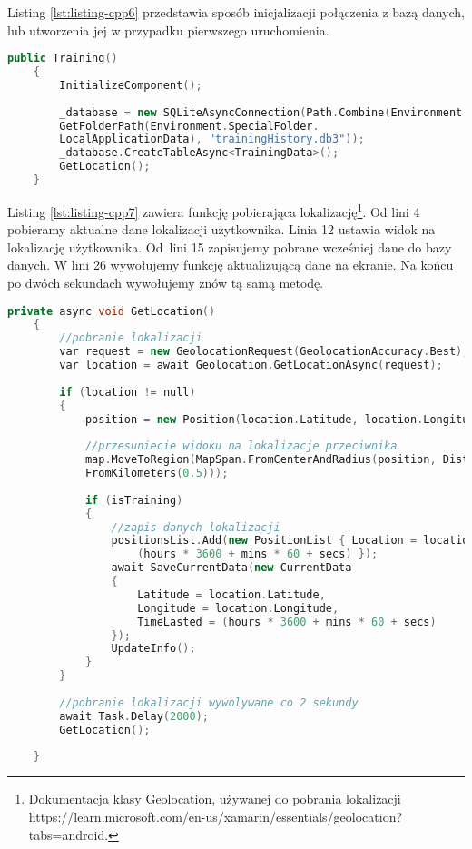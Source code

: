 \hspace{0.60cm}Listing \ref{lst:listing-cpp6} przedstawia sposób inicjalizacji połączenia z bazą danych, lub utworzenia jej w przypadku pierwszego uruchomienia.
\begin{lstlisting}[caption=Połączenie z bazą danych, label={lst:listing-cpp6}, language=C++]
	public Training()
	{
		InitializeComponent();
		
		_database = new SQLiteAsyncConnection(Path.Combine(Environment.
		GetFolderPath(Environment.SpecialFolder.
		LocalApplicationData), "trainingHistory.db3"));
		_database.CreateTableAsync<TrainingData>();
		GetLocation();
	}
\end{lstlisting}

Listing \ref{lst:listing-cpp7} zawiera funkcję pobierająca lokalizację\footnote{Dokumentacja klasy Geolocation, używanej do pobrania lokalizacji   https://learn.microsoft.com/en-us/xamarin/essentials/geolocation?tabs=android\cite{www5}.}. Od lini 4 pobieramy aktualne dane lokalizacji użytkownika. Linia 12 ustawia widok na lokalizację użytkownika. Od~lini 15 zapisujemy pobrane wcześniej dane do bazy danych.
W lini 26 wywołujemy funkcję aktualizującą dane na ekranie. Na końcu po dwóch sekundach wywołujemy znów tą samą metodę.
\begin{lstlisting}[caption=Pobranie lokalizacji, label={lst:listing-cpp7}, language=C++]
	private async void GetLocation()
	{
		//pobranie lokalizacji
		var request = new GeolocationRequest(GeolocationAccuracy.Best);
		var location = await Geolocation.GetLocationAsync(request);
		
		if (location != null)
		{
			position = new Position(location.Latitude, location.Longitude);
			
			//przesuniecie widoku na lokalizacje przeciwnika
			map.MoveToRegion(MapSpan.FromCenterAndRadius(position, Distance.
			FromKilometers(0.5)));
			
			if (isTraining)
			{   
				//zapis danych lokalizacji
				positionsList.Add(new PositionList { Location = location, TimeLasted = 
					(hours * 3600 + mins * 60 + secs) });
				await SaveCurrentData(new CurrentData
				{
					Latitude = location.Latitude,
					Longitude = location.Longitude,
					TimeLasted = (hours * 3600 + mins * 60 + secs)
				});
				UpdateInfo();
			}			
		}
		
		//pobranie lokalizacji wywolywane co 2 sekundy
		await Task.Delay(2000);
		GetLocation();
		
	}
\end{lstlisting}

